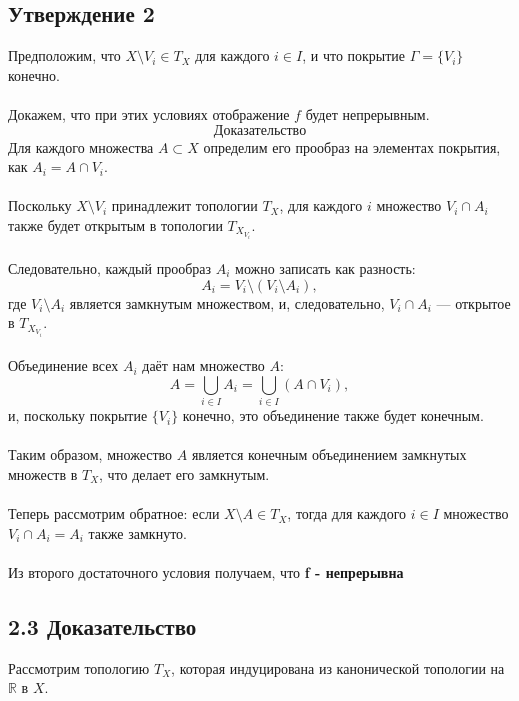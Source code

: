 \documentclass{article}
\begin{document}
        \subsection*{Утверждение 2}
        Предположим, что \( X \setminus V_i \in T_X \) для каждого \( i \in I \), и что покрытие \( \Gamma = \{ V_i \} \) конечно.\\ \\ Докажем, что при этих условиях отображение \( f \) будет непрерывным.
        \[
            \textbf{Доказательство} 
        \]
        Для каждого множества \( A \subset X \) определим его прообраз на элементах покрытия, как \( A_i = A \cap V_i \).\\ \\ Поскольку \( X \setminus V_i \) принадлежит топологии \( T_X \), для каждого \( i \) множество \( V_i \cap A_i \) также будет открытым в топологии \( T_{X_{V_i}} \).\\ \\ Следовательно, каждый прообраз \( A_i \) можно записать как разность:
        \[
        A_i = V_i \setminus (V_i \setminus A_i),
        \]
        где \( V_i \setminus A_i \) является замкнутым множеством, и, следовательно, \( V_i \cap A_i \) — открытое в \( T_{X_{V_i}} \).\\ \\
        Объединение всех \( A_i \) даёт нам множество \( A \):
        \[
        A = \bigcup_{i \in I} A_i = \bigcup_{i \in I} (A \cap V_i),
        \]
        и, поскольку покрытие \( \{ V_i \} \) конечно, это объединение также будет конечным. \\ \\ Таким образом, множество \( A \) является конечным объединением замкнутых множеств в \( T_X \), что делает его замкнутым.\\ \\
        Теперь рассмотрим обратное: если \( X \setminus A \in T_X \), тогда для каждого \( i \in I \) множество \( V_i \cap A_i = A_i \) также замкнуто.\\ \\ Из второго достаточного условия получаем, что \textbf{f - непрерывна}


        \subsection*{2.3 Доказательство}
        Рассмотрим топологию \( T_X \), которая индуцирована из канонической топологии на \( \mathbb{R} \) в \( X \).
\end{document}
